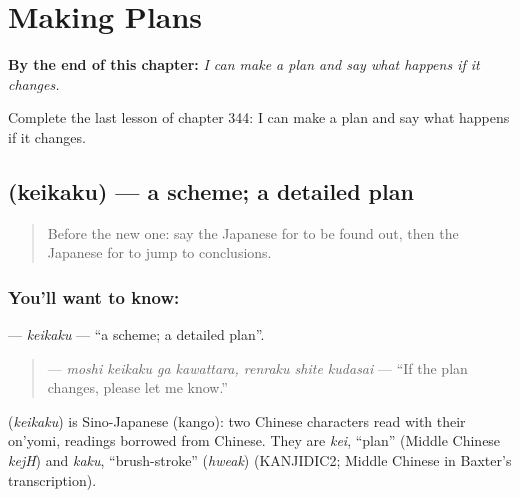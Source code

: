 
\chapter{Making Plans}
\label{ch:ja-making-plans}

\begin{chapteropening}
\textbf{By the end of this chapter:} \emph{I can make a plan and say what happens if it changes.}

Complete the last lesson of chapter 344: I can make a plan and say what happens if it changes.
\end{chapteropening}

\section[\texorpdfstring{\ja{けいかく} (keikaku)}{けいかく (keikaku)}]{ (keikaku) — a scheme; a detailed plan}

\label{lesson:JA-C344-keikaku}



\begin{quote}
Before the new one: say the Japanese for to be found out, then the Japanese for to jump to conclusions.
\end{quote}

\subsection*{You'll want to know: }
\textbf{} — \emph{keikaku} — \textquotedblleft{}a scheme; a detailed plan\textquotedblright{}.

\begin{quote}
\textbf{   } — \emph{moshi keikaku ga kawattara, renraku shite kudasai} — \textquotedblleft{}If the plan changes, please let me know.\textquotedblright{}
\end{quote}

\begin{cousinweb}
\textbf{} (\emph{keikaku}) is Sino-Japanese (kango): two Chinese characters read with their on'yomi, readings borrowed from Chinese. They are \emph{kei}, \textquotedblleft{}plan\textquotedblright{} (Middle Chinese \emph{kejH}) and \emph{kaku}, \textquotedblleft{}brush-stroke\textquotedblright{} (\emph{hweak}) (KANJIDIC2; Middle Chinese in Baxter's transcription).
\end{cousinweb}

